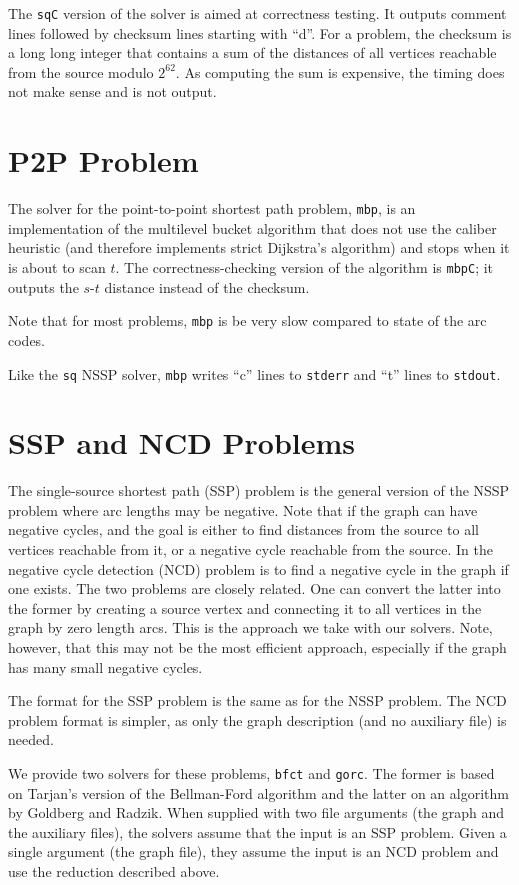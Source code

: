 \documentclass[11pt]{article}
\begin{document}
The {\tt sqC} version of the solver is aimed at correctness testing.
It outputs comment lines followed by checksum lines starting with ``d''.
For a problem, the checksum is a long long integer that contains a sum of
the distances of all vertices reachable from the source modulo $2^{62}$.
As computing the sum is expensive, the timing does not make
sense and is not output.

\section{P2P Problem}

The solver for the point-to-point shortest path problem, {\tt mbp},
is an implementation of the multilevel bucket algorithm that
does not use the caliber heuristic (and therefore implements
strict Dijkstra's algorithm) and stops when it is about to scan $t$.
The correctness-checking version of the algorithm is {\tt mbpC};
it outputs the $s$-$t$ distance instead of the checksum.

Note that for most problems, {\tt mbp} is be very slow compared
to state of the arc codes.

Like the {\tt sq} NSSP solver, {\tt mbp} writes ``c'' lines to {\tt stderr} and ``t'' lines to {\tt stdout}.


\section{SSP and NCD Problems}

The single-source shortest path (SSP) problem is the general
version of the NSSP problem where arc lengths may be negative.
Note that if the graph can have negative cycles, and the goal is
either to find distances from the source to all vertices reachable
from it, or a negative cycle reachable from the source.
In the negative cycle detection (NCD) problem is to find a negative
cycle in the graph if one exists. The two problems are closely
related. One can convert the latter into the former by creating a
source vertex and connecting it to all vertices in the graph by zero
length arcs. This is the approach we take with our solvers. Note,
however, that this may not be the most efficient approach, especially
if the graph has many small negative cycles.

The format for the SSP problem is the same as for the NSSP
problem. The NCD problem format is simpler, as only the graph
description (and no auxiliary file) is needed.

We provide two solvers for these problems, {\tt bfct} and {\tt gorc}.
The former is based on Tarjan's version of the Bellman-Ford algorithm
and the latter on an algorithm by Goldberg and Radzik. When supplied
with two file arguments (the graph and the auxiliary files), the
solvers assume that the input is an SSP problem. Given a single
argument (the graph file), they assume the input is an NCD problem and
use the reduction described above.
\end{document}
